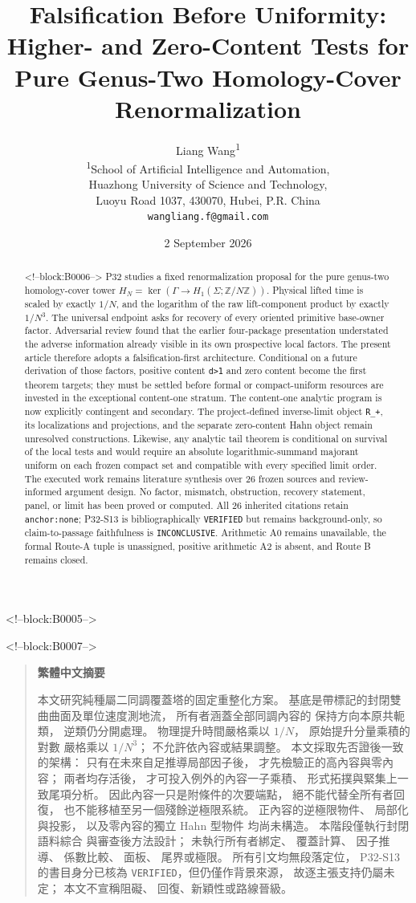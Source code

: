 \documentclass[11pt]{article}
\title{Falsification Before Uniformity:\\
Higher- and Zero-Content Tests for Pure Genus-Two Homology-Cover Renormalization}
\author{Liang Wang\textsuperscript{1}\\
\small \textsuperscript{1}School of Artificial Intelligence and Automation,\\
\small Huazhong University of Science and Technology,\\
\small Luoyu Road 1037, 430070, Hubei, P.R. China\\
\small \texttt{wangliang.f@gmail.com}}
\date{2 September 2026}
\newenvironment{zhabstract}
  {\begin{quotation}\cjkfont\small\raggedright\noindent\textbf{繁體中文摘要}\par\smallskip\mdseries}
  {\end{quotation}}
\begin{document}
\maketitle

<!--block:B0005-->
\begin{abstract}

<!--block:B0006-->
P32 studies a fixed renormalization proposal for the pure genus-two
homology-cover tower
$H_N=\ker(\Gamma\to H_1(\Sigma;\mathbb Z/N\mathbb Z))$. Physical
lifted time is scaled by exactly $1/N$, and the logarithm of the
raw lift-component product by exactly $1/N^3$. The universal
endpoint asks for recovery of every oriented primitive base-owner
factor. Adversarial review found that the earlier four-package presentation
understated the adverse information already visible in its own
prospective local factors. The present article therefore adopts a
falsification-first architecture. Conditional on a future derivation of
those factors, positive content \texttt{d\textgreater{}1} and zero
content become the first theorem targets; they must be settled before
formal or compact-uniform resources are invested in the exceptional
content-one stratum. The content-one analytic program is now explicitly
contingent and secondary. The project-defined inverse-limit object
\texttt{R\_+}, its localizations and projections, and the separate
zero-content Hahn object remain unresolved constructions. Likewise, any
analytic tail theorem is conditional on survival of the local tests and
would require an absolute logarithmic-summand majorant uniform on each
frozen compact set and compatible with every specified limit order. The
executed work remains literature synthesis over 26 frozen sources and
review-informed argument design. No factor, mismatch, obstruction,
recovery statement, panel, or limit has been proved or computed. All 26
inherited citations retain \texttt{anchor:none}; P32-S13 is
bibliographically \texttt{VERIFIED} but remains background-only, so
claim-to-passage faithfulness is \texttt{INCONCLUSIVE}. Arithmetic A0 remains unavailable, the formal
Route-A tuple is unassigned, positive arithmetic A2 is absent, and Route
B remains closed.
\end{abstract}

<!--block:B0007-->
\begin{zhabstract}
本文研究純種屬二同調覆蓋塔的固定重整化方案。 基底是帶標記的封閉雙曲曲面及單位速度測地流， 所有者涵蓋全部同調內容的 保持方向本原共軛類， 逆類仍分開處理。 物理提升時間嚴格乘以 $1/N$， 原始提升分量乘積的對數 嚴格乘以 $1/N^3$； 不允許依內容或結果調整。 本文採取先否證後一致的架構： 只有在未來自足推導局部因子後， 才先檢驗正的高內容與零內容； 兩者均存活後， 才可投入例外的內容一子乘積、 形式拓撲與緊集上一致尾項分析。 因此內容一只是附條件的次要端點， 絕不能代替全所有者回復， 也不能移植至另一個殘餘逆極限系統。 正內容的逆極限物件、 局部化與投影， 以及零內容的獨立 Hahn 型物件 均尚未構造。 本階段僅執行封閉語料綜合 與審查後方法設計； 未執行所有者綁定、 覆蓋計算、 因子推導、 係數比較、 面板、 尾界或極限。 所有引文均無段落定位， P32-S13 的書目身分已核為 \texttt{VERIFIED}，但仍僅作背景來源， 故逐主張支持仍屬未定； 本文不宣稱阻礙、 回復、新穎性或路線晉級。
\end{zhabstract}
\end{document}
